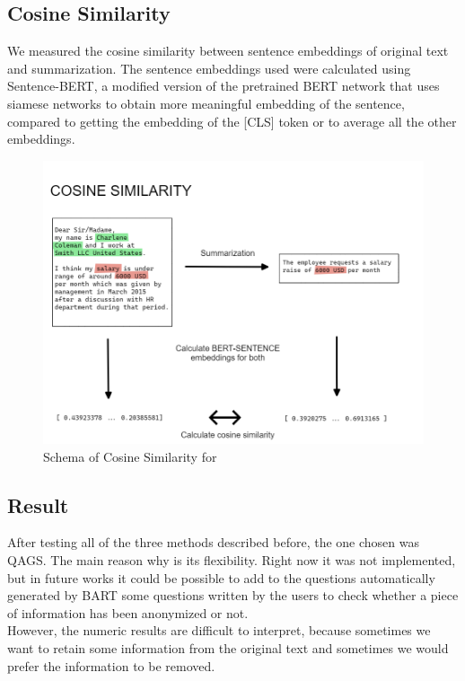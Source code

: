 \subsection{Cosine Similarity}
We measured the cosine similarity between sentence embeddings of original text and summarization. The sentence embeddings used were calculated using Sentence-BERT, a modified version of the pretrained BERT network that uses siamese networks to obtain more meaningful embedding of the sentence, compared to getting the embedding of the [CLS] token or to average all the other embeddings.
\begin{figure}[h] 
    \includegraphics[width=\textwidth]{images/cosine_similarity.png}
    \caption{Schema of Cosine Similarity for }
    \label{fig:schema_cosine_similarity}
\end{figure}    
\subsection*{Result}
After testing all of the three methods described before, the one chosen was QAGS. The main reason why is its flexibility. Right now it was not implemented, but in future works it could be possible to add to the questions automatically generated by BART some questions written by the users to check whether a piece of information has been anonymized or not. \\
However, the numeric results are difficult to interpret, because sometimes we want to retain some information from the original text and sometimes we would prefer the information to be removed. 



